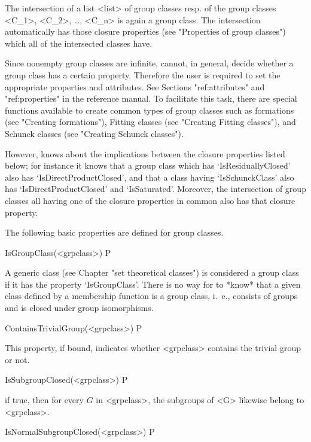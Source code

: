 The intersection of a list <list> of group classes resp. of the group
classes <C_1>, <C_2>, \dots, <C_n> is again
a group class. The intersection automatically has those closure properties
(see "Properties of group classes") which all of the intersected classes
have. 


\null

%
%

Since nonempty group classes are infinite, {\CRISP} cannot, in
general, decide whether a group class has a certain property. Therefore the
user is required to set the appropriate properties and attributes. 
See Sections "ref:attributes" and "ref:properties" in the {\GAP} reference
manual. To facilitate this task, there are special functions available to
create common types of group classes such as formations (see "Creating
formations"), Fitting classes (see "Creating Fitting classes"), and Schunck
classes (see "Creating Schunck classes").

However, {\CRISP}
knows about the implications between the closure properties listed below; for
instance it knows that a group class which has `IsResiduallyClosed' also has
`IsDirectProductClosed', and that a class having `IsSchunckClass' also has
`IsDirectProductClosed' and `IsSaturated'. Moreover, the intersection of
group classes all having one of the closure properties in common also has
that closure property.

The following
basic properties are defined for group classes.

\>IsGroupClass(<grpclass>) P

A generic class (see Chapter "set theoretical classes") is considered a group
class if it has the property `IsGroupClass'. There is no way for {\CRISP} to
*know* that a given class defined by a membership function is a group class,
i.~e., consists of groups and is closed under group isomorphisms.

\> ContainsTrivialGroup(<grpclass>) P

This property, if bound, indicates whether <grpclass> contains the trivial group
or not.

\> IsSubgroupClosed(<grpclass>) P

if true, then for every $G$ in <grpclass>, the subgroups of <G> likewise
belong to <grpclass>.

\> IsNormalSubgroupClosed(<grpclass>) P

